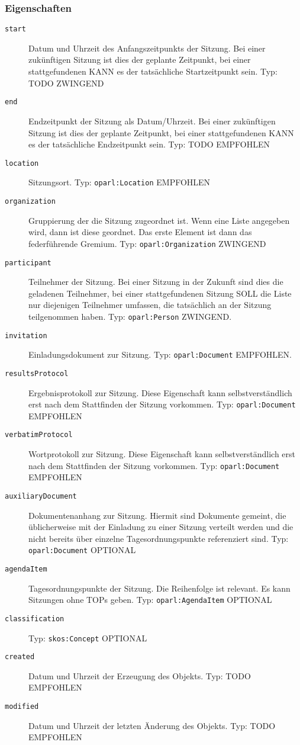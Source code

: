 \documentclass[,a4paper]{article}
\begin{document}
\subsubsection{Eigenschaften}\label{eigenschaften-4}

\begin{description}
\item[\texttt{start}]
Datum und Uhrzeit des Anfangszeitpunkts der Sitzung. Bei einer
zukünftigen Sitzung ist dies der geplante Zeitpunkt, bei einer
stattgefundenen KANN es der tatsächliche Startzeitpunkt sein. Typ: TODO
ZWINGEND
\item[\texttt{end}]
Endzeitpunkt der Sitzung als Datum/Uhrzeit. Bei einer zukünftigen
Sitzung ist dies der geplante Zeitpunkt, bei einer stattgefundenen KANN
es der tatsächliche Endzeitpunkt sein. Typ: TODO EMPFOHLEN
\item[\texttt{location}]
Sitzungsort. Typ: \texttt{oparl:Location} EMPFOHLEN
\item[\texttt{organization}]
Gruppierung der die Sitzung zugeordnet ist. Wenn eine Liste angegeben
wird, dann ist diese geordnet. Das erste Element ist dann das
federführende Gremium. Typ: \texttt{oparl:Organization} ZWINGEND
\item[\texttt{participant}]
Teilnehmer der Sitzung. Bei einer Sitzung in der Zukunft sind dies die
geladenen Teilnehmer, bei einer stattgefundenen Sitzung SOLL die Liste
nur diejenigen Teilnehmer umfassen, die tatsächlich an der Sitzung
teilgenommen haben. Typ: \texttt{oparl:Person} ZWINGEND.
\item[\texttt{invitation}]
Einladungsdokument zur Sitzung. Typ: \texttt{oparl:Document} EMPFOHLEN.
\item[\texttt{resultsProtocol}]
Ergebnisprotokoll zur Sitzung. Diese Eigenschaft kann selbstverständlich
erst nach dem Stattfinden der Sitzung vorkommen. Typ:
\texttt{oparl:Document} EMPFOHLEN
\item[\texttt{verbatimProtocol}]
Wortprotokoll zur Sitzung. Diese Eigenschaft kann selbstverständlich
erst nach dem Stattfinden der Sitzung vorkommen. Typ:
\texttt{oparl:Document} EMPFOHLEN
\item[\texttt{auxiliaryDocument}]
Dokumentenanhang zur Sitzung. Hiermit sind Dokumente gemeint, die
üblicherweise mit der Einladung zu einer Sitzung verteilt werden und die
nicht bereits über einzelne Tagesordnungspunkte referenziert sind. Typ:
\texttt{oparl:Document} OPTIONAL
\item[\texttt{agendaItem}]
Tagesordnungspunkte der Sitzung. Die Reihenfolge ist relevant. Es kann
Sitzungen ohne TOPs geben. Typ: \texttt{oparl:AgendaItem} OPTIONAL
\item[\texttt{classification}]
Typ: \texttt{skos:Concept} OPTIONAL
\item[\texttt{created}]
Datum und Uhrzeit der Erzeugung des Objekts. Typ: TODO EMPFOHLEN
\item[\texttt{modified}]
Datum und Uhrzeit der letzten Änderung des Objekts. Typ: TODO EMPFOHLEN
\end{description}
\end{document}
